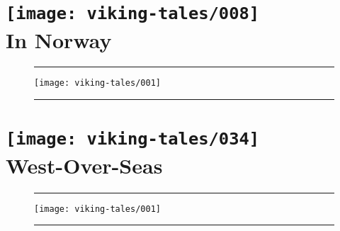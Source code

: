\documentclass[a4paper,12pt,twoside]{book}
\def \chapfig {
    \newpage
    \begin{figure}
        \noindent\rule{\textwidth}{.4pt}
        \vskip8pt
        \centering
        \texttt{[image: viking-tales/001]}
        \noindent\rule{\textwidth}{.4pt}
    \end{figure}
    \cleardoublepage
}
\begin{document}
    \thefrontmatter

    \chapter[\scshape In Norway]{
    \texttt{[image: viking-tales/008]}\\[1cm]
    In Norway}
    \chapfig
    
    
    
    
    
    
    
    
    
    
    

    \chapter[\scshape West-Over-Seas]{
        \texttt{[image: viking-tales/034]}\\[1cm]
        West-Over-Seas}
    \chapfig
    
    
    
    

    \backmatter
    \appendix
    
    \fulllicense
\end{document}
